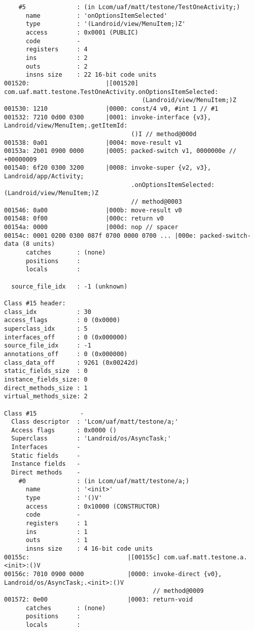 \begin{lstlisting}
    #5              : (in Lcom/uaf/matt/testone/TestOneActivity;)
      name          : 'onOptionsItemSelected'
      type          : '(Landroid/view/MenuItem;)Z'
      access        : 0x0001 (PUBLIC)
      code          -
      registers     : 4
      ins           : 2
      outs          : 2
      insns size    : 22 16-bit code units
001520:                     |[001520] com.uaf.matt.testone.TestOneActivity.onOptionsItemSelected:
                                      (Landroid/view/MenuItem;)Z
001530: 1210                |0000: const/4 v0, #int 1 // #1
001532: 7210 0d00 0300      |0001: invoke-interface {v3}, Landroid/view/MenuItem;.getItemId:
                                   ()I // method@000d
001538: 0a01                |0004: move-result v1
00153a: 2b01 0900 0000      |0005: packed-switch v1, 0000000e // +00000009
001540: 6f20 0300 3200      |0008: invoke-super {v2, v3}, Landroid/app/Activity;
                                   .onOptionsItemSelected:(Landroid/view/MenuItem;)Z
                                   // method@0003
001546: 0a00                |000b: move-result v0
001548: 0f00                |000c: return v0
00154a: 0000                |000d: nop // spacer
00154c: 0001 0200 0300 087f 0700 0000 0700 ... |000e: packed-switch-data (8 units)
      catches       : (none)
      positions     :
      locals        :

  source_file_idx   : -1 (unknown)

Class #15 header:
class_idx           : 30
access_flags        : 0 (0x0000)
superclass_idx      : 5
interfaces_off      : 0 (0x000000)
source_file_idx     : -1
annotations_off     : 0 (0x000000)
class_data_off      : 9261 (0x00242d)
static_fields_size  : 0
instance_fields_size: 0
direct_methods_size : 1
virtual_methods_size: 2

Class #15            -
  Class descriptor  : 'Lcom/uaf/matt/testone/a;'
  Access flags      : 0x0000 ()
  Superclass        : 'Landroid/os/AsyncTask;'
  Interfaces        -
  Static fields     -
  Instance fields   -
  Direct methods    -
    #0              : (in Lcom/uaf/matt/testone/a;)
      name          : '<init>'
      type          : '()V'
      access        : 0x10000 (CONSTRUCTOR)
      code          -
      registers     : 1
      ins           : 1
      outs          : 1
      insns size    : 4 16-bit code units
00155c:                           |[00155c] com.uaf.matt.testone.a.<init>:()V
00156c: 7010 0900 0000            |0000: invoke-direct {v0}, Landroid/os/AsyncTask;.<init>:()V
                                         // method@0009
001572: 0e00                      |0003: return-void
      catches       : (none)
      positions     :
      locals        :


\end{lstlisting}
